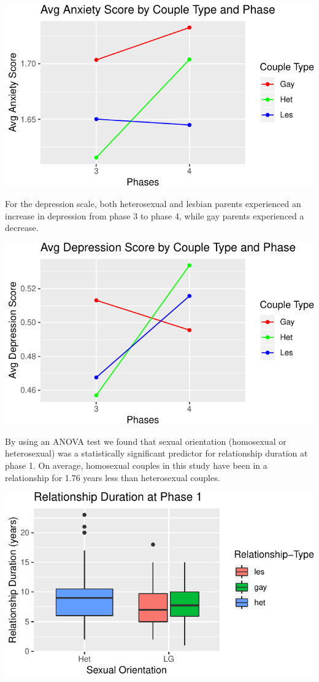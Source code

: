 \documentclass[man]{apa6}
\begin{document}
\includegraphics{final_paper_files/figure-latex/fig3-1.pdf}

For the depression scale, both heterosexual and lesbian parents experienced an increase in depression from phase 3 to phase 4, while gay parents experienced a decrease.

\includegraphics{final_paper_files/figure-latex/fig4-1.pdf}

By using an ANOVA test we found that sexual orientation (homosexual or heterosexual) was a statistically significant predictor for relationship duration at phase 1. On average, homosexual couples in this study have been in a relationship for 1.76 years less than heterosexual couples.

\includegraphics{final_paper_files/figure-latex/fig5-1.pdf}
\end{document}

